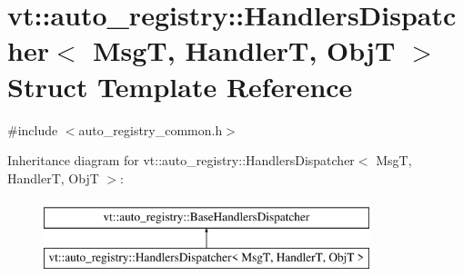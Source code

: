 \hypertarget{structvt_1_1auto__registry_1_1_handlers_dispatcher}{}\section{vt\+:\+:auto\+\_\+registry\+:\+:Handlers\+Dispatcher$<$ MsgT, HandlerT, ObjT $>$ Struct Template Reference}
\label{structvt_1_1auto__registry_1_1_handlers_dispatcher}


{\ttfamily \#include $<$auto\+\_\+registry\+\_\+common.\+h$>$}

Inheritance diagram for vt\+:\+:auto\+\_\+registry\+:\+:Handlers\+Dispatcher$<$ MsgT, HandlerT, ObjT $>$\+:\begin{figure}[H]
\begin{center}
\leavevmode
\includegraphics[height=2.000000cm]{structvt_1_1auto__registry_1_1_handlers_dispatcher}
\end{center}
\end{figure}
